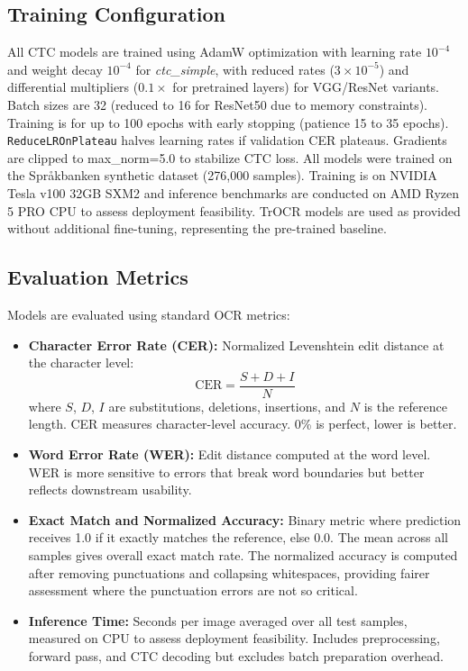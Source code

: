 \documentclass[conference]{IEEEtran}
\newcommand{\trainSamples}{276,000}
\begin{document}
\subsection{Training Configuration}
\label{subsec:training_config}

All CTC models are trained using AdamW optimization with learning rate $10^{-4}$ and weight decay $10^{-4}$ for \textit{ctc\_simple}, with reduced rates ($3 \times 10^{-5}$) and differential multipliers ($0.1\times$ for pretrained layers) for VGG/ResNet variants. Batch sizes are 32 (reduced to 16 for ResNet50 due to memory constraints). Training is for up to 100 epochs with early stopping (patience 15 to 35 epochs). \texttt{ReduceLROnPlateau} halves learning rates if validation CER plateaus. Gradients are clipped to max\_norm=5.0 to stabilize CTC loss. All models were trained on the Spr\r{a}kbanken synthetic dataset (\trainSamples{} samples). 
Training is on NVIDIA Tesla v100 32GB SXM2 and inference benchmarks are conducted on AMD Ryzen 5 PRO CPU to assess deployment feasibility.
TrOCR models are used as provided without additional fine-tuning, representing the pre-trained baseline.

\subsection{Evaluation Metrics}
\label{subsec:metrics}

Models are evaluated using standard OCR metrics:

\begin{itemize}
    \item \textbf{Character Error Rate (CER):} Normalized Levenshtein edit distance at the character level:
\begin{equation}
    \text{CER} = \frac{S + D + I}{N}
\end{equation}
where $S$, $D$, $I$ are substitutions, deletions, insertions, and $N$ is the reference length.
CER measures character-level accuracy. 0\% is perfect, lower is better.

\item \textbf{Word Error Rate (WER):} Edit distance computed at the word level. WER is more sensitive to errors that break word boundaries but better reflects downstream usability.

\item \textbf{Exact Match and Normalized Accuracy:} Binary metric where prediction receives 1.0 if it exactly matches the reference, else 0.0. The mean across all samples gives overall exact match rate. The normalized accuracy is computed after removing punctuations and collapsing whitespaces, providing fairer assessment where the punctuation errors are not so critical. 

\item \textbf{Inference Time:} Seconds per image averaged over all test samples, measured on CPU to assess deployment feasibility. Includes preprocessing, forward pass, and CTC decoding but excludes batch preparation overhead.

\end{itemize}
\end{document}
